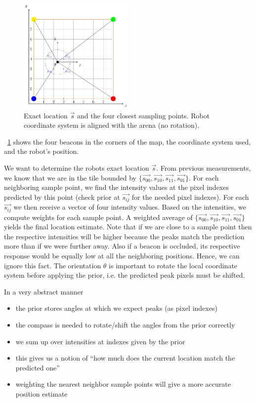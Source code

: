 \begin{figure}[H]
\centering
\includegraphics[width=0.5\textwidth]{figures/fig_localization_grid.pdf}
\caption{Exact location $\vec{s}$ and the four closest sampling points. Robot coordinate system is aligned with the arena (no rotation).}
\label{fig:localization_grid}
\end{figure}

\figurename~\ref{fig:localization_grid} shows the four beacons in the corners of the map, the coordinate system used, and the robot's position.

We want to determine the robots exact
location $\vec{s}$. From previous measurements, we know that we are in the tile
bounded by $\{\vec{s_{00}},\vec{s_{10}},\vec{s_{11}},\vec{s_{01}}\}$. For each 
neighboring sample point, we find the intensity values at the pixel indexes 
predicted by this point (check prior at $\vec{s_{ij}}$ for the needed pixel indexes).
For each $\vec{s_{ij}}$ we then receive a vector of four intensity values. 
Based on the intensities, we compute weights for each sample point. A weighted 
average of  $\{\vec{s_{00}},\vec{s_{10}},\vec{s_{11}},\vec{s_{01}}\}$ yields the
final location estimate.
Note that if we are 
close to a sample point then the respective intensities will be higher because the
peaks match the prediction more than if we were further away. Also if a beacon is
occluded, its respective response would be equally low at all the neighboring  
positions. Hence, we can ignore this fact.
The orientation $\theta$ is important to rotate the local coordinate system before
applying the prior, i.e. the predicted peak pixels must be shifted.

In a very abstract manner 
\begin{itemize}
    \item the prior stores angles at which we expect peaks (as pixel indexes)
    \item the compass is needed to rotate/shift the angles from the prior correctly
    \item we sum up over intensities at indexes given by the prior
    \item this gives us a notion of ``how much does the current location match the predicted one''
    \item weighting the nearest neighbor sample points will give a more accurate
    position estimate
\end{itemize}



